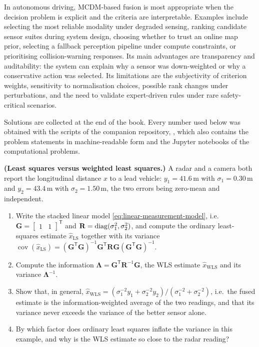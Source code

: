 In autonomous driving, MCDM-based fusion is most appropriate when the decision problem is explicit and the criteria are interpretable. Examples include selecting the most reliable modality under degraded sensing, ranking candidate sensor suites during system design, choosing whether to trust an online map prior, selecting a fallback perception pipeline under compute constraints, or prioritising collision-warning responses. Its main advantages are transparency and auditability: the system can explain why a sensor was down-weighted or why a conservative action was selected. Its limitations are the subjectivity of criterion weights, sensitivity to normalisation choices, possible rank changes under perturbations, and the need to validate expert-driven rules under rare safety-critical scenarios.

\problemsection
Solutions are collected at the end of the book. Every number used below was obtained with the scripts of the companion repository, , which also contains the problem statements in machine-readable form and the Jupyter notebooks of the computational problems.

\begin{prob}\label{prob:ch03:1}
\textbf{(Least squares versus weighted least squares.)} A radar and a camera both report the longitudinal distance $x$ to a lead vehicle: $y_1=41.6$\,m with $\sigma_1=0.30$\,m and $y_2=43.4$\,m with $\sigma_2=1.50$\,m, the two errors being zero-mean and independent.
\begin{enumerate}
\item[(a)] Write the stacked linear model \eqref{eq:linear-measurement-model}, i.e.\ $\mathbf{G}=\begin{bmatrix}1&1\end{bmatrix}^{\mathsf T}$ and $\mathbf{R}=\operatorname{diag}(\sigma_1^{2},\sigma_2^{2})$, and compute the ordinary least-squares estimate $\widehat{x}_{\mathrm{LS}}$ together with its variance $\operatorname{cov}(\widehat{x}_{\mathrm{LS}})=(\mathbf{G}^{\mathsf T}\mathbf{G})^{-1}\mathbf{G}^{\mathsf T}\mathbf{R}\mathbf{G}(\mathbf{G}^{\mathsf T}\mathbf{G})^{-1}$.
\item[(b)] Compute the information $\mathbf{\Lambda}=\mathbf{G}^{\mathsf T}\mathbf{R}^{-1}\mathbf{G}$, the WLS estimate $\widehat{x}_{\mathrm{WLS}}$ and its variance $\mathbf{\Lambda}^{-1}$.
\item[(c)] Show that, in general, $\widehat{x}_{\mathrm{WLS}}=(\sigma_1^{-2}y_1+\sigma_2^{-2}y_2)/(\sigma_1^{-2}+\sigma_2^{-2})$, i.e.\ the fused estimate is the information-weighted average of the two readings, and that its variance never exceeds the variance of the better sensor alone.
\item[(d)] By which factor does ordinary least squares inflate the variance in this example, and why is the WLS estimate so close to the radar reading?
\end{enumerate}
\end{prob}

